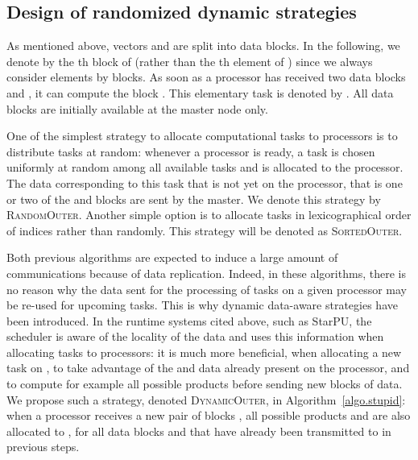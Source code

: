 \documentclass[a4paper,10pt]{article}
\newcommand{\simplerandom}{\textsc{Random\-Outer}\xspace}
\newcommand{\simplesorted}{\textsc{Sorted\-Outer}\xspace}
\newcommand{\stupid}{\textsc{Dynamic\-Outer}\xspace}
\begin{document}
\subsection{Design of randomized dynamic strategies}

As mentioned above, vectors  and  are split into  data
blocks. In the following, we denote by  the th block of 
(rather than the th element of ) since we always consider
elements by blocks. As soon as a processor has received two data
blocks  and , it can compute the block . This elementary task is denoted
by . All data blocks are initially available at the master
node only.


One of the simplest strategy to allocate computational tasks to
processors is to distribute tasks at random: whenever a processor is
ready, a task  is chosen uniformly at random among all
available tasks and is allocated to the processor. The data
corresponding to this task that is not yet on the processor, that is
one or two of the  and  blocks are sent by the master.  We
denote this strategy by \simplerandom.
Another simple option is to allocate tasks in
lexicographical order of indices  rather than randomly. This strategy will be denoted as
\simplesorted.








Both previous algorithms are expected to induce a large amount of
communications because of data replication. Indeed, in these
algorithms, there is no reason why the data sent for the processing of
tasks on a given processor  may be re-used for upcoming
tasks. This is why dynamic data-aware strategies have been
introduced. In the runtime systems cited above, such as StarPU, the
scheduler is aware of the locality of the data and uses this
information when allocating tasks to processors: it is much more
beneficial, when allocating a new task on , to take advantage of
the  and  data already present on the processor, and to compute
for example all possible products  before sending new
blocks of data. We propose such a strategy, denoted \stupid, in
Algorithm~\ref{algo.stupid}: when a processor  receives a new
pair of blocks , all possible products  and
 are also allocated to , for all data blocks
 and  that have already been transmitted to  in
previous steps.



\begin{algorithm}[htbp]
  \DontPrintSemicolon
  \caption{\stupid strategy.}
  \label{algo.stupid}
\end{algorithm}
\end{document}
